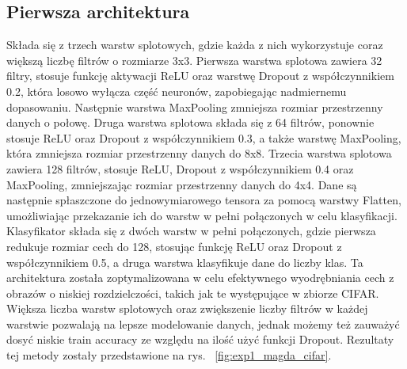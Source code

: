 \documentclass[10pt]{article}
\begin{document}
\subsection*{Pierwsza architektura}
Składa się z trzech warstw splotowych, gdzie każda z nich wykorzystuje coraz większą liczbę filtrów o rozmiarze 3x3.
Pierwsza warstwa splotowa zawiera 32 filtry, stosuje funkcję aktywacji ReLU oraz warstwę Dropout z współczynnikiem 0.2, która losowo wyłącza część neuronów, zapobiegając nadmiernemu dopasowaniu.
Następnie warstwa MaxPooling zmniejsza rozmiar przestrzenny danych o połowę.
Druga warstwa splotowa składa się z 64 filtrów, ponownie stosuje ReLU oraz Dropout z współczynnikiem 0.3, a także warstwę MaxPooling, która zmniejsza rozmiar przestrzenny danych do 8x8.
Trzecia warstwa splotowa zawiera 128 filtrów, stosuje ReLU, Dropout z współczynnikiem 0.4 oraz MaxPooling, zmniejszając rozmiar przestrzenny danych do 4x4.
Dane są następnie spłaszczone do jednowymiarowego tensora za pomocą warstwy Flatten, umożliwiając przekazanie ich do warstw w pełni połączonych w celu klasyfikacji.
Klasyfikator składa się z dwóch warstw w pełni połączonych, gdzie pierwsza redukuje rozmiar cech do 128, stosując funkcję ReLU oraz Dropout z współczynnikiem 0.5, a druga warstwa klasyfikuje dane do liczby klas.
Ta architektura została zoptymalizowana w celu efektywnego wyodrębniania cech z obrazów o niskiej rozdzielczości, takich jak te występujące w zbiorze CIFAR.
Większa liczba warstw splotowych oraz zwiększenie liczby filtrów w każdej warstwie pozwalają na lepsze modelowanie danych, jednak możemy też zauważyć dosyć niskie train accuracy ze względu na ilość użyć funkcji Dropout.
Rezultaty tej metody zostały przedstawione na rys. ~\ref{fig:exp1_magda_cifar}.

\MagdaCifarLarge{}
\end{document}
